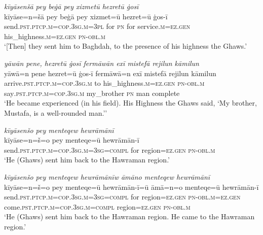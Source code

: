 \ea \label{ZP.14}
\textit{kīyāsenšā pey beġā pey xizmetū hezretū ġosī} \\ 
\gll kīyāse=n=šā pey beġā pey xizmet=ū hezret=ū ġos-ī \\ 
 send\textsc{.pst}\textsc{.ptcp}\textsc{.m}\textsc{=cop}\textsc{.3sg}\textsc{.m}\textsc{=3pl} for \textsc{pn} for service\textsc{.m}\textsc{\textsc{=ez.gen}} his\_highness\textsc{.m}\textsc{\textsc{=ez.gen}} \textsc{pn}\textsc{-obl}\textsc{.m} \\ 
\glt `[Then] they sent him to Baghdah, to the presence of his highness the Ghaws.'
\z 
 
\ea \label{ZP.18}
\textit{yāwān pene, hezretū ġosī fermāwān exī mistefā rejilun kāmilun} \\ 
\gll yāwā=n pene hezret=ū ġos-ī fermāwā=n exī mistefā rejilun kāmilun \\ 
 arrive\textsc{.pst}\textsc{.ptcp}\textsc{.m}\textsc{=cop}\textsc{.3sg}\textsc{.m} to his\_highness\textsc{.m}\textsc{\textsc{=ez.gen}} \textsc{pn}\textsc{-obl}\textsc{.m} say\textsc{.pst}\textsc{.ptcp}\textsc{.m}\textsc{=cop}\textsc{.3sg}\textsc{.m} my\_brother \textsc{pn} man complete \\ 
\glt `He became experienced (in his field). His Highness the Ghaws said, ‘My brother, Mustafa, is a well-rounded man.’'
\z 
 
\ea \label{ZP.20}
\textit{kīyāsenšo pey menteqew hewrāmānī} \\ 
\gll kīyāse=n=š=o pey menteqe=ū hewrāmān-ī \\ 
 send\textsc{.pst}\textsc{.ptcp}\textsc{.m}\textsc{=cop}\textsc{.3sg}\textsc{.m}\textsc{=3sg}\textsc{=compl} for region\textsc{\textsc{=ez.gen}} \textsc{pn}\textsc{-obl}\textsc{.m} \\ 
\glt `He (Ghaws) sent him back to the Hawraman region.'
\z 
 
\ea \label{ZP.21}
\textit{kīyāsenšo pey menteqew hewrāmānīw āmāno menteqew hewrāmānī} \\ 
\gll kīyāse=n=š=o pey menteqe=ū hewrāmān-ī=ū āmā=n=o menteqe=ū hewrāmān-ī \\ 
 send\textsc{.pst}\textsc{.ptcp}\textsc{.m}\textsc{=cop}\textsc{.3sg}\textsc{.m}\textsc{=3sg}\textsc{=compl} for region\textsc{\textsc{=ez.gen}} \textsc{pn}\textsc{-obl}\textsc{.m}\textsc{\textsc{=ez.gen}} come\textsc{.pst}\textsc{.ptcp}\textsc{.m}\textsc{=cop}\textsc{.3sg}\textsc{.m}\textsc{=compl} region\textsc{\textsc{=ez.gen}} \textsc{pn}\textsc{-obl}\textsc{.m} \\ 
\glt `He (Ghaws) sent him back to the Hawraman region. He came to the Hawraman region.'
\z 
 
